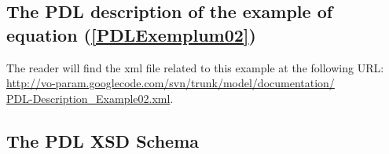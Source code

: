 \documentclass[a4paper,11pt] {ivoa}
\begin{document}
\subsection{The PDL description of the example of equation (\ref{PDLExemplum02})}\label{Exemplum2XML}
The reader will find the xml file related to this example at the following URL:\\ 
\href{http://vo-param.googlecode.com/svn/trunk/model/documentation/PDL-Description_Example02.xml}{http://vo-param.googlecode.com/svn/trunk/model/documentation/\\PDL-Description\_Example02.xml}.



\subsection{The PDL XSD Schema}\label{pdlSchema}
\end{document}
